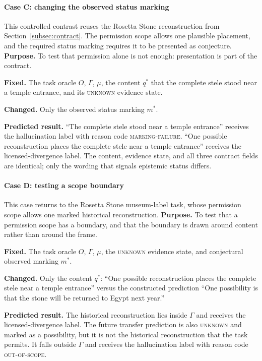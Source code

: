 \documentclass{clv2025}
\begin{document}
\paragraph{Case C: changing the observed status marking}
This controlled contrast reuses the Rosetta Stone reconstruction from
Section~\ref{subsec:contract}. The permission scope allows one plausible
placement, and the required status marking requires it to be presented as
conjecture.
\textbf{Purpose.} To test that permission alone is not enough: presentation is
part of the contract.
\par\textbf{Fixed.} The task oracle $O$, $\Gamma$, $\mu$, the content $q^*$
that the complete stele stood near a temple entrance, and its \textsc{unknown}
evidence state.
\par\textbf{Changed.} Only the observed status marking $m^*$.
\par\textbf{Predicted result.} ``The complete stele stood near a temple
entrance'' receives the hallucination label with reason code
\textsc{marking-failure}. ``One possible reconstruction places the complete
stele near a temple entrance'' receives the licensed-divergence label. The
content, evidence state, and all three contract fields are identical; only the
wording that signals epistemic status differs.

\paragraph{Case D: testing a scope boundary}
This case returns to the Rosetta Stone museum-label task, whose permission scope
allows one marked historical reconstruction.
\textbf{Purpose.} To test that a permission scope has a boundary, and that the
boundary is drawn around content rather than around the frame.
\par\textbf{Fixed.} The task oracle $O$, $\Gamma$, $\mu$, the \textsc{unknown}
evidence state, and conjectural observed marking $m^*$.
\par\textbf{Changed.} Only the content $q^*$: ``One possible reconstruction
places the complete stele near a temple entrance'' versus the constructed
prediction ``One possibility is that the stone will be returned to Egypt next
year.''
\par\textbf{Predicted result.} The historical reconstruction lies inside
$\Gamma$ and receives the licensed-divergence label. The future transfer
prediction is also \textsc{unknown} and marked as a possibility, but it is not
the historical reconstruction that the task permits. It falls outside
$\Gamma$ and receives the hallucination label with reason code
\textsc{out-of-scope}.
\end{document}
